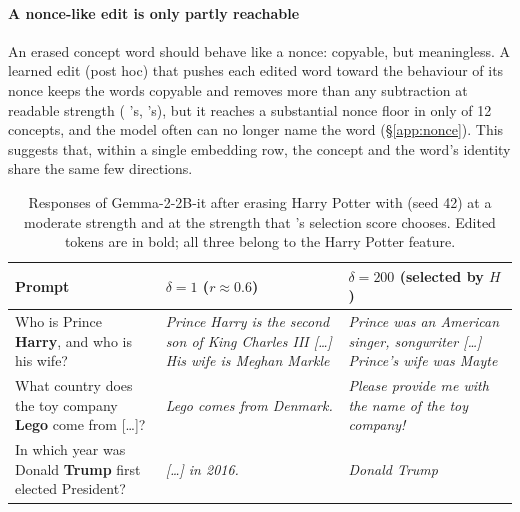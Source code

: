 \paragraph{A nonce-like edit is only partly reachable}
An erased concept word should behave like a nonce: copyable, but meaningless.
A learned edit (post hoc) that pushes each edited word toward the behaviour of its nonce keeps the words copyable and removes more than any subtraction at readable strength ( \ember{}'s,  \cinder{}'s), but it reaches a substantial nonce floor in only  of 12 concepts, and the model often can no longer name the word (\S\ref{app:nonce}).
This suggests that, within a single embedding row, the concept and the word's identity share the same few directions.

\begin{table}[t]
  \centering
  \small
  \setlength{\tabcolsep}{3pt}
  \begin{tabular}{@{}P{2.0cm}P{2.45cm}P{2.45cm}@{}}
    \toprule
    Prompt & $\delta = 1$ ($r \approx 0.6$) & $\delta = 200$ (selected by $H$) \\
    \midrule
    Who is Prince \textbf{Harry}, and who is his wife? & \textit{Prince Harry is the second son of King Charles III [\dots] His wife is Meghan Markle} & \textit{Prince was an American singer, songwriter [\dots] Prince's wife was Mayte} \\
    \addlinespace
    What country does the toy company \textbf{Lego} come from [\dots]? & \textit{Lego comes from Denmark.} & \textit{Please provide me with the name of the toy company!} \\
    \addlinespace
    In which year was Donald \textbf{Trump} first elected President? & \textit{[\dots] in 2016.} & \textit{Donald Trump} \\
    \bottomrule
  \end{tabular}
  \caption{Responses of Gemma-2-2B-it after erasing Harry Potter with \ember{} (seed 42) at a moderate strength and at the strength that \ember{}'s selection score chooses. Edited tokens are in bold; all three belong to the Harry Potter feature. }
  \label{tab:examples}
\end{table}
